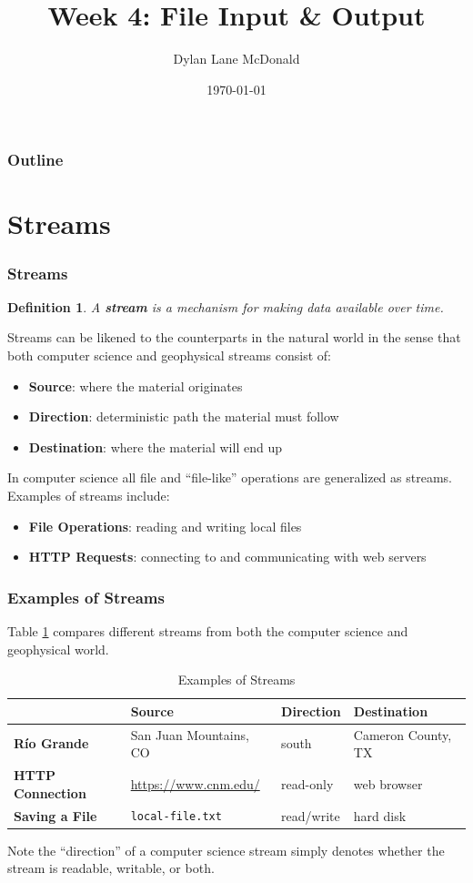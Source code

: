 \documentclass[aspectratio=169]{beamer}
\title{Week 4: File Input \& Output}
\author{Dylan Lane McDonald}
\institute{CNM STEMulus Center\\Web Development with PHP}
\date{\today}
\newtheorem{defn}{Definition}
\begin{document}
\lstset{language=Java}
\begin{frame}
\titlepage
\end{frame}

\begin{frame}
\frametitle{Outline}
\tableofcontents
\end{frame}

\section{Streams}
\begin{frame}
\frametitle{Streams}
\begin{defn}
A \textbf{stream} is a mechanism for making data available over time.
\end{defn}
Streams can be likened to the counterparts in the natural world in the sense that both computer science and geophysical streams consist of:
\begin{itemize}
	\item \textbf{Source}: where the material originates
	\item \textbf{Direction}: deterministic path the material must follow
	\item \textbf{Destination}: where the material will end up
\end{itemize}
In computer science all file and ``file-like'' operations are generalized as streams. Examples of streams include:
\begin{itemize}
	\item \textbf{File Operations}: reading and writing local files
	\item \textbf{HTTP Requests}: connecting to and communicating with web servers
\end{itemize}
\end{frame}

\begin{frame}
\frametitle{Examples of Streams}
Table \ref{tbl:streams} compares different streams from both the computer science and geophysical world.
\begin{table}
\begin{tabular}{|l|l|l|l|}
\hline
& \textbf{Source} & \textbf{Direction} & \textbf{Destination}\\
\hline
\textbf{R\'{i}o Grande} & San Juan Mountains, CO & south & Cameron County, TX\\
\hline
\textbf{HTTP Connection} & \url{https://www.cnm.edu/} & read-only & web browser\\
\hline
\textbf{Saving a File} & \texttt{local-file.txt} & read/write & hard disk\\
\hline
\end{tabular}
\caption{Examples of Streams}
\label{tbl:streams}
\end{table}

Note the ``direction'' of a computer science stream simply denotes whether the stream is readable, writable, or both.
\end{frame}
\end{document}
